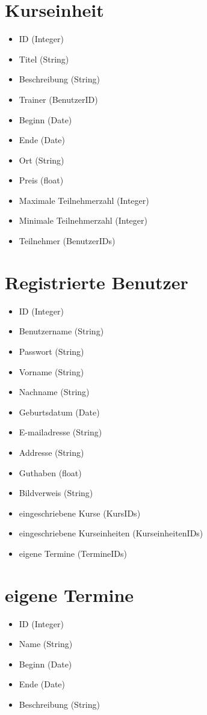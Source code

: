 \documentclass[a4paper]{scrreprt}
\newcounter{Lc}
\newcounter{Hc}
\newcommand{\stepHc}{\stepcounter{Hc}\setcounter{Lc}{0}}
\begin{document}
	\section{Kurseinheit}
	 \Func {} 
		 \begin{itemize}
		 	\item ID (Integer)
		 	\item Titel (String)
		 	\item Beschreibung (String)
		 	\item Trainer (BenutzerID)
		 	\item Beginn (Date)
		 	\item Ende (Date)
		 	\item Ort (String)
		 	\item Preis (\gls{float})
		 	\item Maximale Teilnehmerzahl (Integer)
		 	\item Minimale Teilnehmerzahl (Integer)
		 	\item Teilnehmer (BenutzerIDs)
		 \end{itemize}   
    
    
\stepHc	   		
    \section{Registrierte Benutzer}
		  \Func {} 
		 \begin{itemize}
			\item ID (Integer)
		  	\item Benutzername (String)
		  	\item Passwort (String)
		  	\item Vorname (String)
		  	\item Nachname (String)
		  	\item Geburtsdatum (Date)
		  	\item E-mailadresse (String)
		  	\item Addresse (String)
		  	\item Guthaben (float)
		  	\item Bildverweis (String)
		  	\item eingeschriebene Kurse (KursIDs)
		  	\item eingeschriebene Kurseinheiten (KurseinheitenIDs)
		  	\item eigene Termine (TermineIDs)
		  \end{itemize}

\stepHc		    
	  \section{eigene Termine}
	    \Func {} 
	    \begin{itemize}
	    	\item ID (Integer)
	    	\item Name (String)
	    	\item Beginn (Date)
	    	\item Ende (Date)
	    	\item Beschreibung (String)
	    \end{itemize}
	   
\end{document}
